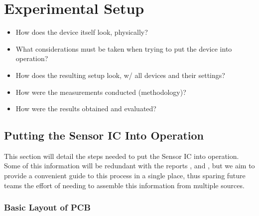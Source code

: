 \chapter{Experimental Setup}
\label{ch:experimentalSetup}

\begin{itemize}\tightlist
    \item
        How does the device itself look, physically?
    \item
        What considerations must  be taken when trying to put  the device into
        operation?
    \item
        How does the resulting setup look, w/ all devices and their settings?
    \item
        How were the measurements conducted (methodology)?
    \item
        How were the results obtained and evaluated?
\end{itemize}



\section{Putting the Sensor IC Into Operation}
\label{sec:ICintoOperation}

This  section  will  detail  the  steps  needed to  put  the  Sensor  IC  into
operation. Some  of  this  information  will be  redundant  with  the  reports
\cite{ref:burgherr},  \cite{ref:gloor} and  \cite{ref:baier},  but  we aim  to
provide a  convenient guide to  this process in  a single place,  thus sparing
future teams the effort of needing  to assemble this information from multiple
sources.


\subsection{Basic Layout of PCB}
\label{subsec:PCBLayout}

